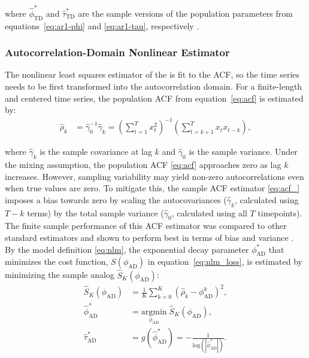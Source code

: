 \documentclass[9pt]{article}
\newcommand{\hatphitd}{\hat{\phi}^*_{\scriptscriptstyle\text{TD}}}
\newcommand{\hattautd}{\hat{\tau}^*_{\scriptscriptstyle\text{TD}}}
\newcommand{\phiad}{\phi_{\scriptscriptstyle\text{AD}}}
\newcommand{\hatphiad}{\hat{\phi}^*_{\scriptscriptstyle\text{AD}}}
\newcommand{\hattauad}{\hat{\tau}^*_{\scriptscriptstyle\text{AD}}}
\begin{document}
\noindent where $\hatphitd$ and $\hattautd$ are the sample versions of the population parameters from equations~\eqref{eq:ar1-phi} and \eqref{eq:ar1-tau}, respectively \citep[Chapter~14.3]{hansen_econometrics_2022}.\\


\subsubsection{Autocorrelation-Domain Nonlinear Estimator}\label{sec:autocorrelation-domain-nonlinear-estimator}
The nonlinear least squares estimator of the  is fit to the ACF, so the time series needs to be first transformed into the autocorrelation domain. For a finite-length and centered time series, the population ACF from equation~\eqref{eq:acf} is estimated by:
\begin{align}\label{eq:acf_}
    \hat\rho_k &= \hat\gamma_0^{-1}\hat\gamma_k = \left(\sum_{t=1}^T x_t^2\right)^{-1} \left(\sum_{t=k+1}^{T}x_t x_{t-k}\right),
\end{align}

\noindent where $\hat\gamma_k$ is the sample covariance at lag $k$ and $\hat\gamma_0$ is the sample variance. Under the mixing assumption, the population ACF \eqref{eq:acf} approaches zero as lag $k$ increases. However, sampling variability may yield non-zero autocorrelations even when true values are zero. To mitigate this, the sample ACF estimator \eqref{eq:acf_} imposes a bias towards zero by scaling the autocovariances ($\hat \gamma_k$, calculated using $T-k$ terms) by the total sample variance ($\hat\gamma_0$, calculated using all $T$ timepoints). The finite sample performance of this ACF estimator was compared to other standard estimators and shown to perform best in terms of bias and variance \citep{marriott_bias_1954}.\\

By the model definition \eqref{eq:nlm}, the exponential decay parameter $\phiad^*$ that minimizes the cost function, $S(\phiad)$ in equation~\eqref{eq:nlm_loss}, is estimated by minimizing the sample analog $\widehat{S}_{K}(\phiad)$:
\begin{align}
    \widehat{S}_{K}(\phiad) &= \frac{1}{K} \sum_{k=0}^K (\hat\rho_k - \phiad^k)^2, \label{eq:nls_loss_}\\
    \hatphiad &= \underset{\phiad}{\text{argmin}} \; \widehat{S}_{K}(\phiad), \label{eq:nls_phi_}\\
    \hattauad &= g(\hatphiad) = -\frac{1}{\text{log}(|\hatphiad|)}.
\end{align}
\end{document}
